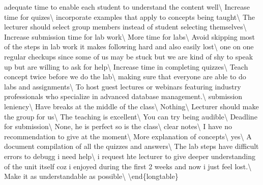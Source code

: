 \documentclass[
]{article}
\begin{document}
adequate time to enable each student to understand the content
well\textbackslash{} \hline Increase time for quizes\textbackslash{}
\hline incorporate examples that apply to concepts being
taught\textbackslash{} \hline The lecturer should select group members
instead of student selecting themselves\textbackslash{} \hline Increase
submission time for lab work\textbackslash{} \hline More time for
labs\textbackslash{} \hline Avoid skipping most of the steps in lab work
it makes following hard and also easily lost\textbackslash{} \hline one
on one regular checkups since some of us may be stuck but we are kind of
shy to speak up but are willing to ask for help\textbackslash{} \hline
Increase time in completing quizzes\textbackslash{} \hline Teach concept
twice before we do the lab\textbackslash{} \hline making sure that
everyone are able to do labs and assignments\textbackslash{} \hline To
host guest lectures or webinars featuring industry professionals who
specialize in advanced database management.\textbackslash{} \hline
submission leniency\textbackslash{} \hline Have breaks at the middle of
the class\textbackslash{} \hline Nothing\textbackslash{} \hline Lecturer
should make the group for us\textbackslash{} \hline The teaching is
excellent\textbackslash{} \hline You can try being
audible\textbackslash{} \hline Deadline for submission\textbackslash{}
\hline None, he is perfect so is the class\textbackslash{} \hline clear
notes\textbackslash{} \hline I have no recommendation to give at the
moment\textbackslash{} \hline More explanation of
concepts\textbackslash{} \hline yes\textbackslash{} \hline A document
compilation of all the quizzes and answers\textbackslash{} \hline The
lab steps have difficult errors to debugg i need help\textbackslash{}
\hline i request hte lecturer to give deeper understanding of the unit
itself coz i enjoyed during the first 2 weeks and now i just feel
lost.\textbackslash{} \hline Make it as understandable as
possible\textbackslash{} \bottomrule \textbackslash end\{longtable\}
\end{document}
